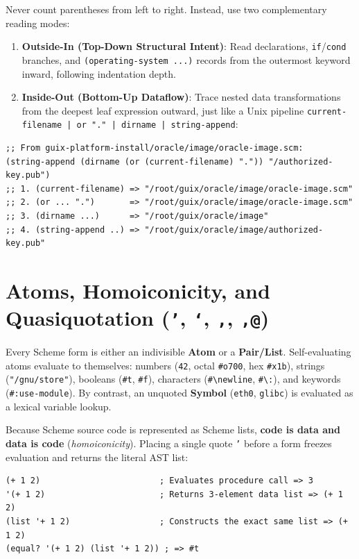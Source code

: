 \documentclass[11pt,oneside]{book}
\begin{document}
\begin{beginnertip}
Never count parentheses from left to right. Instead, use two complementary reading modes:
\begin{enumerate}
  \item \textbf{Outside-In (Top-Down Structural Intent)}: Read declarations, \texttt{if}/\texttt{cond} branches, and \texttt{(operating-system ...)} records from the outermost keyword inward, following indentation depth.
  \item \textbf{Inside-Out (Bottom-Up Dataflow)}: Trace nested data transformations from the deepest leaf expression outward, just like a Unix pipeline \texttt{current-filename | or "." | dirname | string-append}:
\end{enumerate}
\begin{lstlisting}[language=GuileScheme]
;; From guix-platform-install/oracle/image/oracle-image.scm:
(string-append (dirname (or (current-filename) ".")) "/authorized-key.pub")
;; 1. (current-filename) => "/root/guix/oracle/image/oracle-image.scm"
;; 2. (or ... ".")       => "/root/guix/oracle/image/oracle-image.scm"
;; 3. (dirname ...)      => "/root/guix/oracle/image"
;; 4. (string-append ..) => "/root/guix/oracle/image/authorized-key.pub"
\end{lstlisting}
\end{beginnertip}

\section{Atoms, Homoiconicity, and Quasiquotation (\texttt{'}, \texttt{`}, \texttt{,}, \texttt{,@})}

Every Scheme form is either an indivisible \textbf{Atom} or a \textbf{Pair/List}. Self-evaluating atoms evaluate to themselves: numbers (\texttt{42}, octal \texttt{\#o700}, hex \texttt{\#x1b}), strings (\texttt{"/gnu/store"}), booleans (\texttt{\#t}, \texttt{\#f}), characters (\texttt{\#\textbackslash newline}, \texttt{\#\textbackslash :}), and keywords (\texttt{\#:use-module}). By contrast, an unquoted \textbf{Symbol} (\texttt{eth0}, \texttt{glibc}) is evaluated as a lexical variable lookup.

Because Scheme source code is represented as Scheme lists, \textbf{code is data and data is code} (\emph{homoiconicity}). Placing a single quote \texttt{'} before a form freezes evaluation and returns the literal AST list:

\begin{lstlisting}[language=GuileScheme]
(+ 1 2)                        ; Evaluates procedure call => 3
'(+ 1 2)                       ; Returns 3-element data list => (+ 1 2)
(list '+ 1 2)                  ; Constructs the exact same list => (+ 1 2)
(equal? '(+ 1 2) (list '+ 1 2)) ; => #t
\end{lstlisting}
\end{document}
